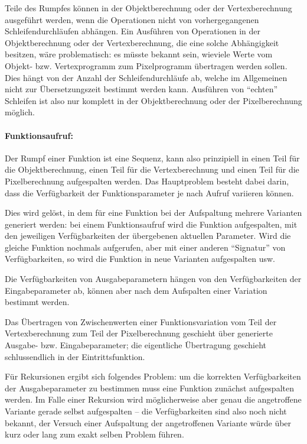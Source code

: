 \documentclass[twoside,a4paper,fleqn,12pt]{book}
\begin{document}
Teile des Rumpfes können in der Objektberechnung oder der Vertexberechnung ausgeführt werden, wenn die Operationen nicht von vorhergegangenen Schleifendurchläufen
abhängen. Ein Ausführen von Operationen in der Objektberechnung oder der Vertexberechnung, die eine solche Abhängigkeit besitzen, wäre problematisch: es müsste bekannt sein, wieviele Werte vom
Objekt- bzw. Vertexprogramm zum Pixelprogramm übertragen werden sollen. Dies hängt von der Anzahl der Schleifendurchläufe ab,
welche im Allgemeinen nicht zur Übersetzungszeit bestimmt werden kann.
Ausführen von "`echten"' Schleifen ist also nur komplett in der Objektberechnung oder der Pixelberechnung möglich.

\paragraph{Funktionsaufruf:} Der Rumpf einer Funktion ist eine Sequenz,
kann also prinzipiell in einen Teil für die Objektberechnung, einen Teil für die Vertexberechnung und einen Teil für die Pixelberechnung aufgespalten werden.
Das Hauptproblem besteht dabei darin, dass die Verfügbarkeit der Funktionsparameter je nach Aufruf variieren können.

Dies wird gelöst, in dem für eine Funktion bei der Aufspaltung mehrere Varianten generiert werden: bei einem Funktionsaufruf
wird die Funktion aufgespalten, mit den jeweiligen Verfügbarkeiten der übergebenen aktuellen Parameter. Wird die gleiche Funktion
nochmals aufgerufen, aber mit einer anderen "`Signatur"' von Verfügbarkeiten, so wird die Funktion in neue Varianten aufgespalten usw.

Die Verfügbarkeiten von Ausgabeparametern hängen von den Verfügbarkeiten der Eingabeparameter ab, können aber nach dem Aufspalten
einer Variation bestimmt werden.

Das Übertragen von Zwischenwerten einer Funktionsvariation vom Teil der Vertexberechnung zum Teil der Pixelberechnung geschieht über generierte Ausgabe- bzw.
Eingabeparameter; die eigentliche Übertragung geschieht schlussendlich in der Eintrittsfunktion.

Für Rekursionen ergibt sich folgendes Problem:
um die korrekten Verfügbarkeiten der Ausgabeparameter zu bestimmen
muss eine Funktion zunächst aufgespalten werden. Im Falle einer Rekursion wird möglicherweise aber genau die angetroffene
Variante gerade selbst aufgespalten -- die Verfügbarkeiten sind also noch nicht bekannt, der Versuch einer Aufspaltung der
angetroffenen Variante würde über kurz oder lang zum exakt selben Problem führen.
\end{document}
